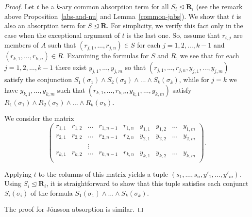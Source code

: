 \documentclass{amsart}
\theoremstyle{plain}
\theoremstyle{definition}
\begin{document}
\begin{proof}
  Let $t$ be a $k$-ary common absorption term for all $S_i\operatorname{\trianglelefteq} {\mathbf{{R}}}_i$ (see the remark above Proposition~\ref{abs-and-nu} and Lemma~\ref{common-jabs}). We
  show that $t$ is also an absorption term for $S\operatorname{\trianglelefteq} {\mathbf{{R}}}$. For
  simplicity, we verify this fact only in the case when the exceptional
  argument of $t$ is the last one. So, assume that
  $r_{i,j}$ are members of $A$ such that
  $(r_{j,1},\dots,r_{j,n})\in S$ for each $j=1,2,\dots,k-1$ and
  $(r_{k,1},\dots,r_{k,n})\in R$. Examining the formulas for $S$ and $R$, we see that
  for each $j=1,2,\dots,k-1$ there exist $y_{j,1},\dots,y_{j,m}$ so that 
  $(r_{j,1},\dots,r_{j,n},y_{j,1},\dots,y_{j,m})$ satisfy the conjunction
  $S_1(\sigma_1){\mathop{\wedge}} S_2(\sigma_2){\mathop{\wedge}}\dots{\mathop{\wedge}} S_k(\sigma_k)$, while for $j=k$
  we have $y_{k,1},\dots,y_{k,m}$ such that
  $(r_{k,1},\dots,r_{k,n},y_{k,1},\dots,y_{k,m})$ satisfy
  $R_1(\sigma_1){\mathop{\wedge}} R_2(\sigma_2){\mathop{\wedge}}\dots{\mathop{\wedge}} R_k(\sigma_k)$.

  We consider the matrix
  \[
    \begin{pmatrix}
      r_{1,1}&r_{1,2}&\dots&r_{1,n-1}&r_{1,n}&y_{1,1}&y_{1,2}&\dots&y_{1,m}\\
      r_{2,1}&r_{2,2}&\dots&r_{2,n-1}&r_{2,n}&y_{2,1}&y_{2,2}&\dots&y_{2,m}\\
      &&\vdots\\                                
      r_{k,1}&r_{k,2}&\dots&r_{k,n-1}&r_{k,n}&y_{k,1}&y_{k,2}&\dots&y_{k,m}\\
    \end{pmatrix}.
  \]

  Applying $t$ to the columns of this matrix yields a tuple
  $(s_1,\dots,s_n,y'_1,\dots,y'_m)$. Using $S_i\operatorname{\trianglelefteq} {\mathbf{{R}}}_i$, it is
  straightforward to show that this tuple satisfies each conjunct
  $S_i(\sigma_i)$ of the
  formula
  $S_1(\sigma_1){\mathop{\wedge}} \dots{\mathop{\wedge}} S_k(\sigma_k)$.

  The proof for J\'onsson absorption is similar.
\end{proof}
\end{document}
